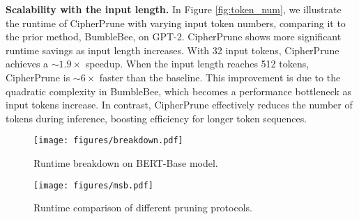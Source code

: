 

\noindent\textbf{Scalability with the input length.} 
In Figure \ref{fig:token_num}, we illustrate the runtime of CipherPrune with varying input token numbers, comparing it to the prior method, BumbleBee, on GPT-2. CipherPrune shows more significant runtime savings as input length increases. With 32 input tokens, CipherPrune achieves a $\sim 1.9\times$ speedup. When the input length reaches 512 tokens, CipherPrune is $\sim6\times$ faster than the baseline. This improvement is due to the quadratic complexity in BumbleBee, which becomes a performance bottleneck as input tokens increase. In contrast, CipherPrune effectively reduces the number of tokens during inference, boosting efficiency for longer token sequences.

\begin{figure}[h]
    \centering
    \begin{minipage}{0.75\textwidth}
        \centering
        \texttt{[image: figures/breakdown.pdf]}
        \captionsetup{skip=2pt}
        \caption{Runtime breakdown on BERT-Base model.}
        \label{fig:breakdown}
    \end{minipage}\hfill
    \begin{minipage}{0.25\textwidth}
      \centering
      \texttt{[image: figures/msb.pdf]}
      \caption{Runtime comparison of different pruning protocols.}
      \label{fig:msb}
    \end{minipage}
\end{figure}

